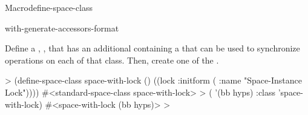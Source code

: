 \documentclass[10pt,twoside,english,pdftex]{article}
\begin{document}
\begin{functiondoc}{Macro}{define-space-class}
\classoptioninheritance

\begin{alsos}{with-generate-accessors-format}
\end{alsos}

\fnexample 
{}%
Define a ,
, that has an additional 
containing a  that can be used to synchronize
operations on each  of that class. Then, create
one  of the 
.
%
\W\supp
\begin{example}
  > (define-space-class space-with-lock ()
      ((lock :initform ( :name "Space-Instance Lock"))))
  #<standard-space-class space-with-lock>
  > ( '(bb hyps) 
      :class 'space-with-lock)
  #<space-with-lock (bb hyps)>
  >
\end{example}

\end{functiondoc}

\end{document}
